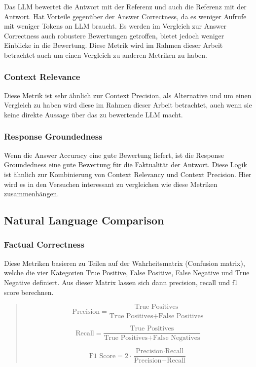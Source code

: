 Das LLM bewertet die Antwort mit der Referenz und auch die Referenz mit der Antwort.
Hat Vorteile gegenüber der Answer Correctness, da es weniger Aufrufe mit weniger Tokens an LLM braucht.
Es werden im Vergleich zur Answer Correctness auch robustere Bewertungen getroffen, bietet jedoch weniger Einblicke in die Bewertung.
Diese Metrik wird im Rahmen dieser Arbeit betrachtet auch um einen Vergleich zu anderen Metriken zu haben.

\subsubsection{Context Relevance}
Diese Metrik ist sehr ähnlich zur Context Precision, als Alternative und um einen Vergleich zu haben wird diese im Rahmen dieser Arbeit betrachtet, auch wenn sie keine direkte Aussage über das zu bewertende LLM macht.

\subsubsection{Response Groundedness}
Wenn die Answer Accuracy eine gute Bewertung liefert, ist die Response Groundedness eine gute Bewertung für die Faktualität der Antwort.
Diese Logik ist ähnlich zur Kombinierung von Context Relevancy und Context Precision.
Hier wird es in den Versuchen interessant zu vergleichen wie diese Metriken zusammenhängen.
\subsection{Natural Language Comparison}

\subsubsection{Factual Correctness}
Diese Metriken basieren zu Teilen auf der Wahrheitsmatrix (Confusion matrix), welche die vier Kategorien True Positive, False Positive, False Negative und True Negative definiert.\cite{wikipedia_confusion_matrix}
Aus dieser Matrix lassen sich dann precision, recall und f1 score berechnen.

\begin{quote}
\begin{equation}
  \label{eq:precision}
  \text{Precision} = \frac{\text{True Positives}}{\text{True Positives} + \text{False Positives}}
\end{equation}

\begin{equation}
  \label{eq:recall}
  \text{Recall} = \frac{\text{True Positives}}{\text{True Positives} + \text{False Negatives}}
\end{equation}

\begin{equation}
  \label{eq:f1_score}
  \text{F1 Score} = 2 \cdot \frac{\text{Precision} \cdot \text{Recall}}{\text{Precision} + \text{Recall}}
\end{equation}
\cite{wikipedia_confusion_matrix}
\end{quote}

